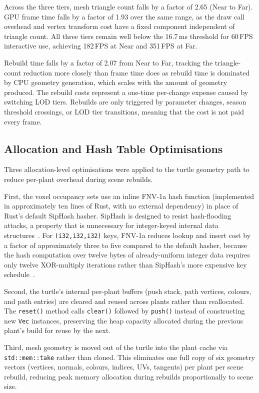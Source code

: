 Across the three tiers, mesh triangle count falls by a factor of 2.65 (Near to Far). GPU frame time falls by
a factor of 1.93 over the same range, as the draw call overhead and vertex transform cost have a fixed
component independent of triangle count. All three tiers remain well below the 16.7\,ms threshold for 60\,FPS
interactive use, achieving 182\,FPS at Near and 351\,FPS at Far.

\medskip
Rebuild time falls by a factor of 2.07 from Near to Far, tracking the triangle-count reduction more closely
than frame time does as rebuild time is dominated by CPU geometry generation, which scales with the amount of
geometry produced. The rebuild costs represent a one-time per-change expense caused by switching LOD tiers.
Rebuilds are only triggered by parameter changes, season threshold crossings, or LOD tier transitions,
meaning that the cost is not paid every frame.

\subsection{Allocation and Hash Table Optimisations}

Three allocation-level optimisations were applied to the turtle geometry path to reduce per-plant overhead
during scene rebuilds.

\medskip
First, the voxel occupancy sets use an inline FNV-1a hash function (implemented in approximately ten lines of
Rust, with no external dependency) in place of Rust's default SipHash hasher. SipHash is designed to resist
hash-flooding attacks, a property that is unnecessary for integer-keyed internal data
structures~\cite{aumassonSipHashFastShortInput2012}. For \texttt{(i32,i32,i32)} keys, FNV-1a reduces lookup
and insert cost by a factor of approximately three to five compared to the default hasher, because the hash
computation over twelve bytes of already-uniform integer data requires only twelve XOR-multiply iterations
rather than SipHash's more expensive key schedule~\cite{fowlerFNVNonCryptographicHash2026}.

\medskip
Second, the turtle's internal per-plant buffers (push stack, path vertices, colours, and path entries) are
cleared and reused across plants rather than reallocated. The \texttt{reset()} method calls \texttt{clear()}
followed by \texttt{push()} instead of constructing new \texttt{Vec} instances, preserving the heap capacity
allocated during the previous plant's build for reuse by the next.

\medskip
Third, mesh geometry is moved out of the turtle into the plant cache via \texttt{std::mem::take} rather than
cloned. This eliminates one full copy of six geometry vectors (vertices, normals, colours, indices, UVs,
tangents) per plant per scene rebuild, reducing peak memory allocation during rebuilds proportionally to scene size.


